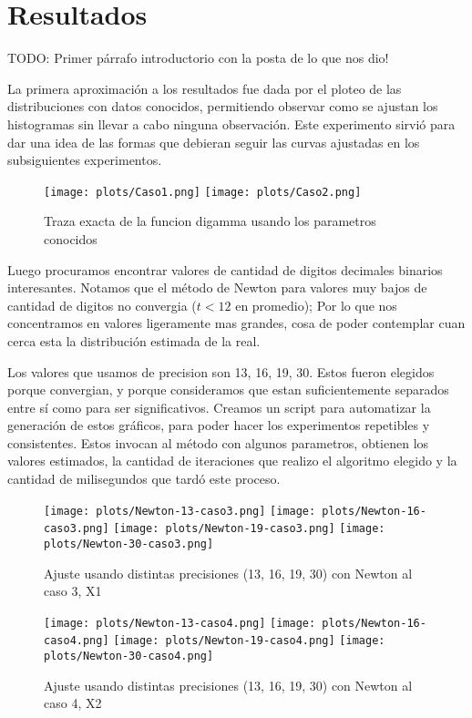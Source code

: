 \section{Resultados}

TODO: Primer p\'arrafo introductorio con la posta de lo que nos dio!

La primera aproximaci\'on a los resultados fue dada por el ploteo de las distribuciones con datos conocidos, permitiendo observar como se ajustan los histogramas sin llevar a cabo ninguna observaci\'on. Este experimento sirvi\'o para dar una idea de las formas que debieran seguir las curvas ajustadas en los subsiguientes experimentos.

\begin{figure} [H]
\begin {center}
\texttt{[image: plots/Caso1.png]}
\texttt{[image: plots/Caso2.png]}
\end {center}
\caption{Traza exacta de la funcion digamma usando los parametros conocidos}
\label{fig:FitCaso3Newton}
\end{figure}

Luego procuramos encontrar valores de cantidad de digitos decimales binarios interesantes. Notamos que el m\'etodo de Newton
para valores muy bajos de cantidad de digitos no convergia ($t < 12$ en promedio); Por lo que nos concentramos en valores
ligeramente mas grandes, cosa de poder contemplar cuan cerca esta la distribuci\'on estimada de la real.

Los valores que usamos de precision son 13, 16, 19, 30. Estos fueron elegidos porque convergian, y porque consideramos que estan
suficientemente separados entre s\'i como para ser significativos. Creamos un script para automatizar la generaci\'on de estos gr\'aficos,
para poder hacer los experimentos repetibles y consistentes. Estos invocan al m\'etodo con algunos parametros, obtienen los
valores estimados, la cantidad de iteraciones que realizo el algoritmo elegido y la cantidad de milisegundos que tard\'o este proceso.


\begin{figure} [H]

\texttt{[image: plots/Newton-13-caso3.png]}
\texttt{[image: plots/Newton-16-caso3.png]}
\texttt{[image: plots/Newton-19-caso3.png]}
\texttt{[image: plots/Newton-30-caso3.png]}

\caption{Ajuste usando distintas precisiones (13, 16, 19, 30) con Newton al caso 3, X1}
\label{fig:FitCaso3Newton}
\end{figure}

\begin{figure} [H]

\texttt{[image: plots/Newton-13-caso4.png]}
\texttt{[image: plots/Newton-16-caso4.png]}
\texttt{[image: plots/Newton-19-caso4.png]}
\texttt{[image: plots/Newton-30-caso4.png]}

\caption{Ajuste usando distintas precisiones (13, 16, 19, 30) con Newton al caso 4, X2}
\label{fig:FitCaso4Newton}
\end{figure}

